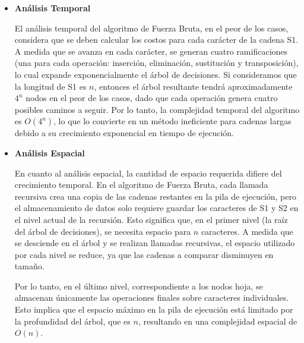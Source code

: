  \begin{itemize}
     \item \textbf{Análisis Temporal}
     
     El análisis temporal del algoritmo de Fuerza Bruta, en el peor de los casos, considera que se deben calcular los costos para cada carácter de la cadena S1. A medida que se avanza en cada carácter, se generan cuatro ramificaciones (una para cada operación: inserción, eliminación, sustitución y transposición), lo cual expande exponencialmente el árbol de decisiones. Si consideramos que la longitud de S1 es \( n \), entonces el árbol resultante tendrá aproximadamente \( 4^n \) nodos en el peor de los casos, dado que cada operación genera cuatro posibles caminos a seguir. Por lo tanto, la complejidad temporal del algoritmo es \( O(4^n) \), lo que lo convierte en un método ineficiente para cadenas largas debido a su crecimiento exponencial en tiempo de ejecución.

    \item \textbf{Análisis Espacial}

    En cuanto al análisis espacial, la cantidad de espacio requerida difiere del crecimiento temporal. En el algoritmo de Fuerza Bruta, cada llamada recursiva crea una copia de las cadenas restantes en la pila de ejecución, pero el almacenamiento de datos solo requiere guardar los caracteres de S1 y S2 en el nivel actual de la recursión. Esto significa que, en el primer nivel (la raíz del árbol de decisiones), se necesita espacio para \( n \) caracteres. A medida que se desciende en el árbol y se realizan llamadas recursivas, el espacio utilizado por cada nivel se reduce, ya que las cadenas a comparar disminuyen en tamaño. 

    Por lo tanto, en el último nivel, correspondiente a los nodos hoja, se almacenan únicamente las operaciones finales sobre caracteres individuales. Esto implica que el espacio máximo en la pila de ejecución está limitado por la profundidad del árbol, que es \( n \), resultando en una complejidad espacial de \( O(n) \).

 \end{itemize}